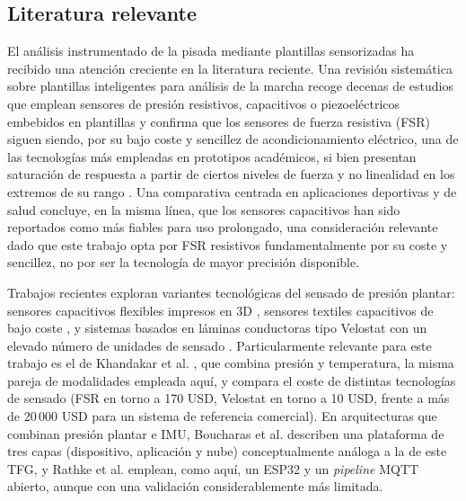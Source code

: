 \begin{IAtext}

\section{Literatura relevante}

El análisis instrumentado de la pisada mediante plantillas sensorizadas ha recibido una atención creciente en la literatura reciente. Una revisión sistemática sobre plantillas inteligentes para análisis de la marcha \cite{smart_insoles_review} recoge decenas de estudios que emplean sensores de presión resistivos, capacitivos o piezoeléctricos embebidos en plantillas y confirma que los sensores de fuerza resistiva (FSR) siguen siendo, por su bajo coste y sencillez de acondicionamiento eléctrico, una de las tecnologías más empleadas en prototipos académicos, si bien presentan saturación de respuesta a partir de ciertos niveles de fuerza y no linealidad en los extremos de su rango \cite{piezo_insole_iohealth}. Una comparativa centrada en aplicaciones deportivas y de salud \cite{burnie_commercial_pressure_sensors_review_2023} concluye, en la misma línea, que los sensores capacitivos han sido reportados como más fiables para uso prolongado, una consideración relevante dado que este trabajo opta por FSR resistivos fundamentalmente por su coste y sencillez, no por ser la tecnología de mayor precisión disponible.

Trabajos recientes exploran variantes tecnológicas del sensado de presión plantar: sensores capacitivos flexibles impresos en 3D \cite{samarentsis_3dprinted_capacitive_insole_2022}, sensores textiles capacitivos de bajo coste \cite{ho_kim_min_textile_capacitive_insole_2022}, y sistemas basados en láminas conductoras tipo Velostat con un elevado número de unidades de sensado \cite{hu_velostat_shoe_gait_phase_2024, low_cost_instrumented_shoe}. Particularmente relevante para este trabajo es el de Khandakar et al. \cite{khandakar_smart_insole_pressure_temperature_2022}, que combina presión y temperatura, la misma pareja de modalidades empleada aquí, y compara el coste de distintas tecnologías de sensado (FSR en torno a 170 USD, Velostat en torno a 10 USD, frente a más de 20\,000 USD para un sistema de referencia comercial). En arquitecturas que combinan presión plantar e IMU, Boucharas et al. \cite{boucharas_smart_insole_parkinson_platform_2022} describen una plataforma de tres capas (dispositivo, aplicación y nube) conceptualmente análoga a la de este TFG, y Rathke et al. \cite{rathke_iot_mqtt_gait_2024} emplean, como aquí, un ESP32 y un \textit{pipeline} MQTT abierto, aunque con una validación considerablemente más limitada.


\end{IAtext}
